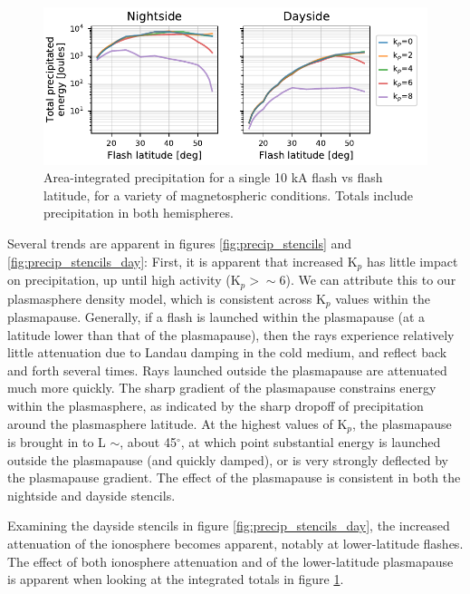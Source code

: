 \begin{figure}[]
\begin{center}
\includegraphics{figures/total_energy_vs_latitude.pdf}
\caption[Total precipitated energy for a single flash]{Area-integrated precipitation for a single 10 kA flash vs flash latitude, for a variety of magnetospheric conditions. Totals include precipitation in both hemispheres.}
\label{fig:total_energy_per_stencil}
\end{center}
\end{figure}

Several trends are apparent in figures \ref{fig:precip_stencils} and \ref{fig:precip_stencils_day}: First, it is apparent that increased K$_p$ has little impact on precipitation, up until high activity (K$_p > \sim 6$). We can attribute this to our plasmasphere density model, which is consistent across K$_p$ values within the plasmapause. Generally, if a flash is launched within the plasmapause (at a latitude lower than that of the plasmapause), then the rays experience relatively little attenuation due to Landau damping in the cold medium, and reflect back and forth several times. Rays launched outside the plasmapause are attenuated much more quickly. The sharp gradient of the plasmapause constrains energy within the plasmasphere, as indicated by the sharp dropoff of precipitation around the plasmasphere latitude. At the highest values of K$_p$, the plasmapause is brought in to L $\sim$, about 45$^\circ$, at which point substantial energy is launched outside the plasmapause (and quickly damped), or is very strongly deflected by the plasmapause gradient. The effect of the plasmapause is consistent in both the nightside and dayside stencils.

Examining the dayside stencils in figure \ref{fig:precip_stencils_day}, the increased attenuation of the ionosphere becomes apparent, notably at lower-latitude flashes. The effect of both ionosphere attenuation and of the lower-latitude plasmapause is apparent when looking at the integrated totals in figure \ref{fig:total_energy_per_stencil}.

